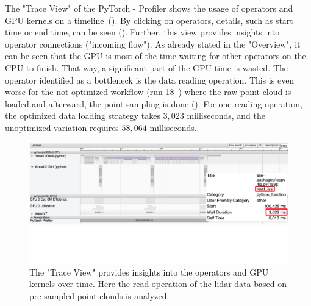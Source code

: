 \documentclass[12pt, a4paper, hidelinks]{article}
\begin{document}
The "Trace View" of the PyTorch - Profiler shows the usage of operators and GPU kernels on a timeline~(). By clicking on operators, details, such as start time or end time, can be seen (). Further, this view provides insights into operator connections ("incoming flow").
As already stated in the "Overview", it can be seen that the GPU is most of the time waiting for other operators on the CPU to finish. That way, a significant part of the GPU time is wasted. The operator identified as a bottleneck is the data reading operation. This is even worse for the not optimized workflow (run 18~) where the raw point cloud is loaded and afterward, the point sampling is done (). For one reading operation, the optimized data loading strategy takes $3,023$ milliseconds, and the unoptimized variation requires $58,064$ milliseconds.

\begin{figure}[H]
\centering
\includegraphics[width=1\textwidth]{./assets/scap_gtx1080_profiler-torch_batch-size-64_14650758_trace-view-laspy}
\caption[PyTorch - Profiler: Trace View of data input]{The "Trace View" provides insights into the operators and GPU kernels over time. Here the read operation of the lidar data based on pre-sampled point clouds is analyzed.}
\label{fig:scap_gtx1080_profiler-torch_batch-size-64_14650758_trace-view-laspy}
\end{figure}
\end{document}
